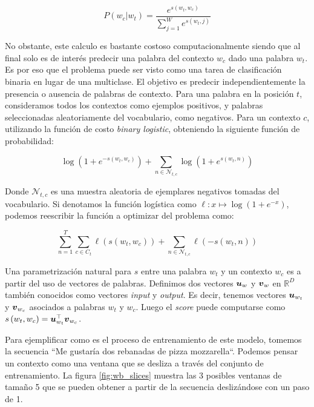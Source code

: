 \begin{equation} \label{eq:skipram-softmax}
    P(w_{c}|w_{t}) = \frac{e^{s(w_t, w_c)}}{\sum_{j=1}^{W} e^{s(w_t, j)}}
\end{equation}

No obstante, este calculo es bastante costoso computacionalmente siendo que al
final solo es de interés predecir una palabra del contexto $w_c$ dado una
palabra $w_t$. Es por eso que el problema puede ser visto como una tarea de
clasificación binaria en lugar de una multiclase. El objetivo es predecir
independientemente la presencia o ausencia de palabras de contexto. Para una
palabra en la posición $t$, consideramos todos los contextos como ejemplos
positivos, y palabras seleccionadas aleatoriamente del vocabulario, como
negativos. Para un contexto $c$, utilizando la función de costo \emph{binary
logistic}, obteniendo la siguiente función de probabilidad:

\begin{equation}
    \log\left( 1 + e^{-s(w_t, w_c)} \right) +
    \sum_{n \in \mathcal{N}_{t, c}} \log\left( 1 + e^{s(w_t, n)} \right)
\end{equation}

Donde $\mathcal{N}_{t, c}$ es una muestra aleatoria de ejemplares negativos
tomadas del vocabulario. Si denotamos la función logística como $\ell: x \mapsto
\log \left(1 + e^{-x} \right)$, podemos reescribir la función a optimizar del
problema como:

\begin{equation}
    \sum_{n=1}^{T} 
        \sum_{c \in C_t} \ell\left(s(w_t, w_c)\right) +
        \sum_{n \in \mathcal{N}_{t, c}} \ell\left(-s(w_t, n) \right)
\end{equation}

Una parametrización natural para $s$ entre una palabra $w_t$ y un contexto $w_c$
es a partir del uso de vectores de palabras. Definimos dos vectores $\boldsymbol{u}_w$
y $\boldsymbol{v}_w$ en $\mathbb{R}^D$ también conocidos como vectores \emph{input} y
\emph{output}. Es decir, tenemos vectores $\boldsymbol{u}_{w_t}$ y $\boldsymbol{v}_{w_c}$
asociados a palabras $w_t$ y $w_c$. Luego el \emph{score} puede computarse como
$s\left( w_t, w_c \right) = \boldsymbol{u}_{w_t}^\top \boldsymbol{v}_{w_c}$.

Para ejemplificar como es el proceso de entrenamiento de este modelo, tomemos la
secuencia ``Me gustaría dos rebanadas de pizza mozzarella``. Podemos pensar un
contexto como una ventana que se desliza a través del conjunto de entrenamiento.
La figura \ref{fig:wb_slices} muestra las 3 posibles ventanas de tamaño 5 que se pueden obtener
a partir de la secuencia deslizándose con un paso de 1.

